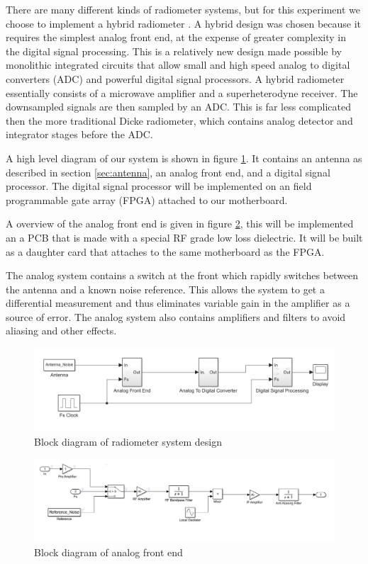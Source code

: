 \documentclass[12pt]{article}
\begin{document}
There are many different kinds of radiometer systems, but for this experiment we choose to implement a hybrid radiometer \cite{skou1989microwave}. A hybrid design was chosen because it requires the simplest analog front end, at the expense of greater complexity in the digital signal processing. This is a relatively new design made possible by monolithic integrated circuits that allow small and high speed analog to digital converters (ADC) and powerful digital signal processors. A hybrid radiometer essentially consists of a microwave amplifier and a superheterodyne receiver. The downsampled signals are then sampled by an ADC. This is far less complicated then the more traditional Dicke radiometer, which contains analog detector and integrator stages before the ADC. 

A high level diagram of our system is shown in figure \ref{fig:system_diagram}. It contains an antenna as described in section \ref{sec:antenna}, an analog front end, and a digital signal processor. The digital signal processor will be implemented on an field programmable gate array (FPGA) attached to our motherboard.

A overview of the analog front end is given in figure \ref{fig:analog_diagram}, this will be implemented an a PCB that is made with a special RF grade low loss dielectric. It will be built as a daughter card that attaches to the same motherboard as the FPGA.

The analog system contains a switch at the front which rapidly switches between the antenna and a known noise reference. This allows the system to get a differential measurement and thus eliminates variable gain in the amplifier as a source of error. The analog system also contains amplifiers and filters to avoid aliasing and other effects.

\begin{figure}
	\centering
	\includegraphics[width=\linewidth]{Figures/radiometer_system.png}
	\caption{Block diagram of radiometer system design}
	\label{fig:system_diagram}
\end{figure}

\begin{figure}
	\centering
	\includegraphics[width=\linewidth]{Figures/analog_front_end.png}
	\caption{Block diagram of analog front end}
	\label{fig:analog_diagram}
\end{figure}
\end{document}

